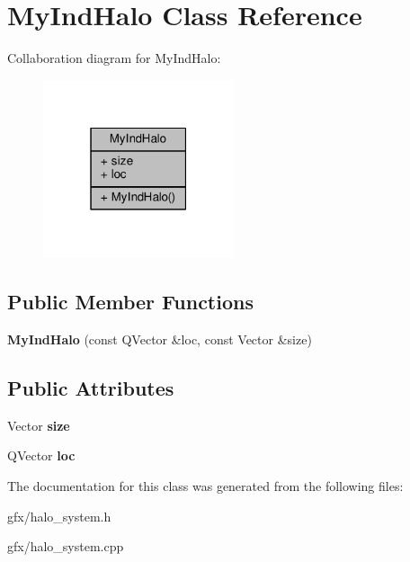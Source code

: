 \hypertarget{classMyIndHalo}{}\section{My\+Ind\+Halo Class Reference}
\label{classMyIndHalo}


Collaboration diagram for My\+Ind\+Halo\+:
\nopagebreak
\begin{figure}[H]
\begin{center}
\leavevmode
\includegraphics[width=159pt]{d2/df5/classMyIndHalo__coll__graph}
\end{center}
\end{figure}
\subsection*{Public Member Functions}
\begin{DoxyCompactItemize}
\item 
{\bfseries My\+Ind\+Halo} (const Q\+Vector \&loc, const Vector \&size)\hypertarget{classMyIndHalo_a630d85f40ad4db45e3b00691c992b6bd}{}\label{classMyIndHalo_a630d85f40ad4db45e3b00691c992b6bd}

\end{DoxyCompactItemize}
\subsection*{Public Attributes}
\begin{DoxyCompactItemize}
\item 
Vector {\bfseries size}\hypertarget{classMyIndHalo_ae9b65c1b9d9769394bbf595ff4260f45}{}\label{classMyIndHalo_ae9b65c1b9d9769394bbf595ff4260f45}

\item 
Q\+Vector {\bfseries loc}\hypertarget{classMyIndHalo_a6af673e9685cbf3dadda15e7ea814d17}{}\label{classMyIndHalo_a6af673e9685cbf3dadda15e7ea814d17}

\end{DoxyCompactItemize}


The documentation for this class was generated from the following files\+:\begin{DoxyCompactItemize}
\item 
gfx/halo\+\_\+system.\+h\item 
gfx/halo\+\_\+system.\+cpp\end{DoxyCompactItemize}
